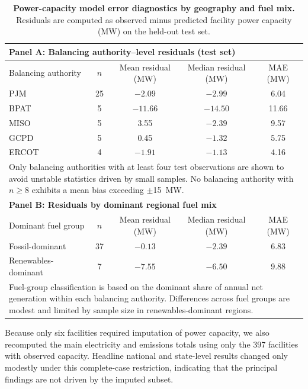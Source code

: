\documentclass[12pt]{article}
\begin{document}
\begin{table}[H]
\centering
\caption{\textbf{Power-capacity model error diagnostics by geography and fuel mix.}
Residuals are computed as observed minus predicted facility power capacity (MW) on the held-out test set.}
\label{tab:error_diagnostics}
\begin{tabular}{lcccc}
\toprule
\multicolumn{5}{l}{\textbf{Panel A: Balancing authority–level residuals (test set)}} \\
\midrule
Balancing authority & $n$ & Mean residual (MW) & Median residual (MW) & MAE (MW) \\
\midrule
PJM  & 25 & $-2.09$ & $-2.99$ & 6.04 \\
BPAT & 5  & $-11.66$ & $-14.50$ & 11.66 \\
MISO & 5  & 3.55 & $-2.39$ & 9.57 \\
GCPD & 5  & 0.45 & $-1.32$ & 5.75 \\
ERCOT & 4 & $-1.91$ & $-1.13$ & 4.16 \\
\midrule
\multicolumn{5}{p{0.9\linewidth}}{\footnotesize
Only balancing authorities with at least four test observations are shown to avoid unstable statistics driven by small samples. No balancing authority with $n \geq 8$ exhibits a mean bias exceeding $\pm$15~MW.}
\\
\midrule
\multicolumn{5}{l}{\textbf{Panel B: Residuals by dominant regional fuel mix}} \\
\midrule
Dominant fuel group & $n$ & Mean residual (MW) & Median residual (MW) & MAE (MW) \\
\midrule
Fossil-dominant      & 37 & $-0.13$ & $-2.39$ & 6.83 \\
Renewables-dominant  & 7  & $-7.55$ & $-6.50$ & 9.88 \\
\midrule
\multicolumn{5}{p{0.9\linewidth}}{\footnotesize
Fuel-group classification is based on the dominant share of annual net generation within each balancing authority. Differences across fuel groups are modest and limited by sample size in renewables-dominant regions.}
\\
\bottomrule
\end{tabular}
\end{table}

Because only six facilities required imputation of power capacity, we also recomputed the main electricity and emissions totals using only the 397 facilities with observed capacity. Headline national and state-level results changed only modestly under this complete-case restriction, indicating that the principal findings are not driven by the imputed subset.
\end{document}
